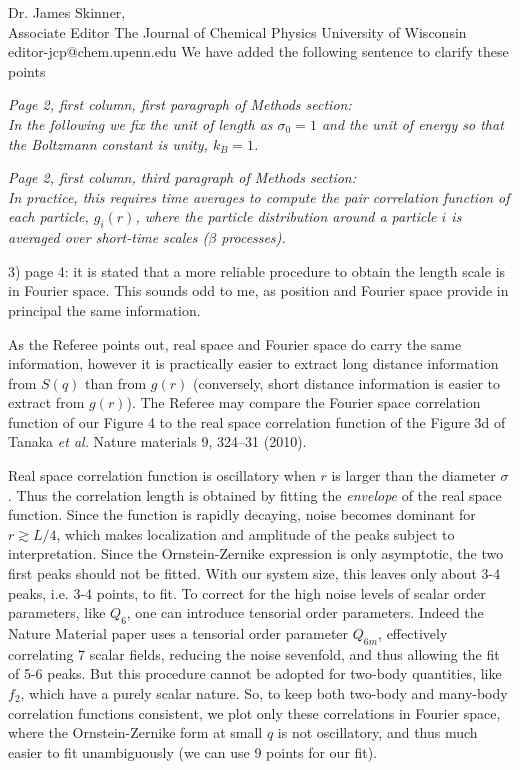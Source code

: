 \documentclass[a4paper, rebuttal, parskip=true, firsthead=false, fromemail=false, foldmarks=false]{scrlttr2}
\begin{document}
\begin{letter}{Dr. James Skinner,\\Associate Editor
The Journal of Chemical Physics
University of Wisconsin\\
editor-jcp@chem.upenn.edu }
We have added the following sentence to clarify these points

{\it Page 2, first column, first paragraph of Methods section:\\
In the following we fix the unit of length as $\sigma_0=1$ and the unit
of energy so that the Boltzmann constant is unity, $k_B=1$.
}

{\it Page 2, first column, third paragraph of Methods section:\\
In practice, this requires time averages to compute the pair correlation function of each particle, $g_i(r)$,
where the particle distribution around a particle $i$ is averaged over short-time scales ($\beta$ processes).
}

\begin{quotationi}
3) page 4: it is stated that a more reliable procedure to obtain the
length scale is in Fourier space. This sounds odd to me, as position and
Fourier space provide in principal the same information.
\end{quotationi}

As the Referee points out, real space and Fourier space do carry the same information, however it is practically easier to extract long distance information from $S(q)$ than from $g(r)$ (conversely, short distance information is easier to extract from $g(r)$). The Referee may compare the Fourier space correlation function of our Figure 4 to the real space correlation function of the Figure 3d of Tanaka \emph{et al.} Nature materials 9, 324–31 (2010).

Real space correlation function is oscillatory when $r$ is larger than the diameter $\sigma$. Thus the correlation length is obtained by fitting the \emph{envelope} of the real space function. Since the function is rapidly decaying, noise becomes dominant for $r\gtrsim L/4$, which makes localization and amplitude of the peaks subject to interpretation. Since the Ornstein-Zernike expression is only asymptotic, the two first peaks should not be fitted. With our system size, this leaves only about 3-4 peaks, i.e. 3-4 points, to fit. To correct for the high noise levels of scalar order parameters, like $Q_6$, one can introduce tensorial order parameters. Indeed the Nature Material paper uses a tensorial order parameter $Q_{6m}$, effectively correlating 7 scalar fields, reducing the noise sevenfold, and thus allowing the fit of 5-6 peaks. But this procedure cannot be adopted for two-body quantities, like $f_2$, which have a purely scalar nature. So, to keep both two-body and many-body
correlation functions consistent, we plot only these correlations in Fourier space, where
the Ornstein-Zernike form at small $q$ is not oscillatory, and thus much easier to fit unambiguously (we can use 9 points for our fit).


\end{letter}
\end{document}
